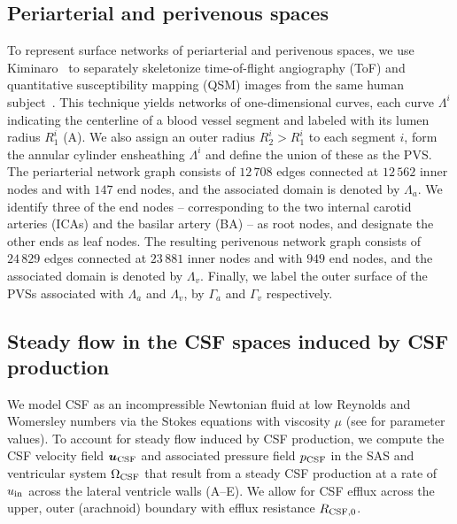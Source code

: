 \documentclass[fleqn,10pt]{wlscirep}
\begin{document}
\subsection*{Periarterial and perivenous spaces}

To represent surface networks of periarterial and perivenous spaces,
we use Kiminaro~\cite{william_silversmith_2021_5539913} to separately
skeletonize time-of-flight angiography (ToF) and quantitative
susceptibility mapping (QSM) images from the same human
subject~\cite{hodneland2019new}. This technique yields networks of
one-dimensional curves, each curve $\Lambda^i$ indicating the
centerline of a blood vessel segment and labeled with its lumen radius
$R_1^i$ (A). We also assign an
outer radius $R_2^i > R_1^i$ to each segment $i$, form the annular
cylinder ensheathing $\Lambda^i$ and define the union of these as the
PVS. The periarterial network graph consists of $12\,708$ edges
connected at $12\,562$ inner nodes and with $147$ end nodes, and the
associated domain is denoted by $\Lambda_a$. We identify three of the
end nodes -- corresponding to the two internal carotid arteries (ICAs)
and the basilar artery (BA) -- as root nodes, and designate the other
ends as leaf nodes. The resulting perivenous network graph consists of
$24\,829$ edges connected at $23\,881$ inner nodes and with $949$ end nodes, and the associated domain is denoted by $\Lambda_v$. Finally, we label the outer surface of the PVSs associated with $\Lambda_a$ and $\Lambda_v$, by $\Gamma_a$ and $\Gamma_v$ respectively.


\subsection*{Steady flow in the CSF spaces induced by CSF production}

We model CSF as an incompressible Newtonian fluid at low Reynolds and
Womersley numbers via the Stokes equations with viscosity $\mu$ (see
 for parameter values). To account for steady
flow induced by CSF production, we compute the CSF velocity field $\bm
u_{\rm CSF}$ and associated pressure field $p_{\rm CSF}$ in the SAS
and ventricular system $\Omega_{\rm CSF}$ that result from a steady
CSF production at a rate of $u_{\rm in}$ across the lateral ventricle
walls (A--E). We allow for CSF efflux across the upper,
outer (arachnoid) boundary with efflux resistance $R_{\rm CSF, 0}$.

\end{document}
